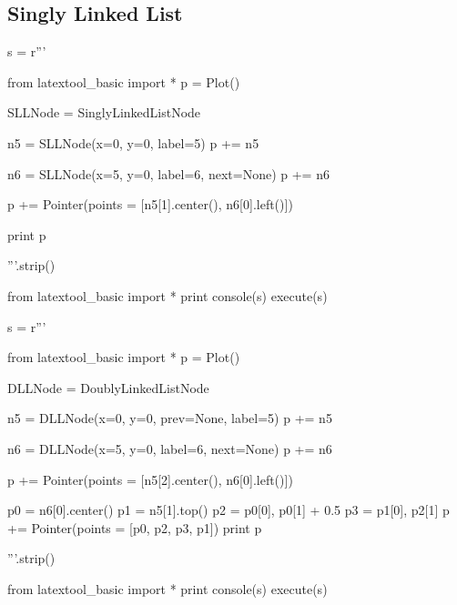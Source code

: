\newpage
\subsection{Singly Linked List}

\begin{python}
s = r'''

from latextool_basic import *
p = Plot()

SLLNode = SinglyLinkedListNode

n5 = SLLNode(x=0, y=0, label=5)
p += n5

n6 = SLLNode(x=5, y=0, label=6, next=None)
p += n6

p += Pointer(points = [n5[1].center(), n6[0].left()])

print p

'''.strip()

from latextool_basic import *
print console(s)
execute(s)
\end{python}

\newpage

\begin{python}
s = r'''

from latextool_basic import *
p = Plot()

DLLNode = DoublyLinkedListNode

n5 = DLLNode(x=0, y=0, prev=None, label=5)
p += n5

n6 = DLLNode(x=5, y=0, label=6, next=None)
p += n6

p += Pointer(points = [n5[2].center(), n6[0].left()])

p0 = n6[0].center()
p1 = n5[1].top()
p2 = p0[0], p0[1] + 0.5
p3 = p1[0], p2[1]
p += Pointer(points = [p0, p2, p3, p1])
print p

'''.strip()

from latextool_basic import *
print console(s)
execute(s)
\end{python}
